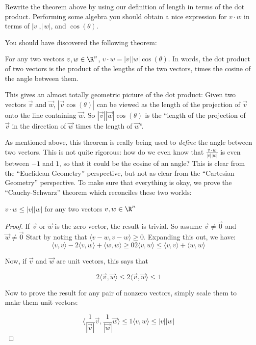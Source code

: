 \begin{question}
	Rewrite the theorem above by using our definition of length in terms of the dot product.  Performing some algebra you should obtain a nice expression for $v\cdot w$
	in terms of $|v|, |w|$, and $\cos(\theta)$.
 \end{question}
 
 You should have discovered the following theorem:
 
 \begin{theorem}
 	For any two vectors $v,w \in \R^n$,  $v \cdot w = |v||w|\cos(\theta)$.  In words, the dot product of two vectors is the product of the lengths of the two vectors,
 	times the cosine of the angle between them.
 \end{theorem}
 
 This gives an almost totally geometric picture of the dot product:  Given two vectors $\vec{v}$ and $\vec{w}$,  $|\vec{v}\cos(\theta)|$ can be viewed as the length of the
 projection of $\vec{v}$ onto the line containing $\vec{w}$.  So $|\vec{v}||\vec{w}|\cos(\theta)$ is the ``length of the projection of $\vec{v}$ in the direction of $\vec{w}$ times the
 length of $\vec{w}$''.
 
 As mentioned above, this theorem is really being used to \textit{define} the angle between two vectors.  This is not quite rigorous:  how do we even know that 
 $\frac{v \cdot w}{|v||w|}$ is even between $-1$ and $1$, so that it could be the cosine of an angle?  This is clear from the ``Euclidean Geometry'' perspective, 
 but not as clear from the ``Cartesian Geometry'' perspective.  To make sure that everything is okay, we prove the ``Cauchy-Schwarz'' theorem which reconciles these two
 worlds:
 
 \begin{theorem}
 	$v \cdot w \leq |v||w|$ for any two vectors $v,w \in \R^n$
 \end{theorem} 
 
 \begin{proof}
 	If $\vec{v}$ or $\vec{w}$ is the zero vector, the result is trivial.  So assume $\vec{v} \neq \vec{0}$ and $\vec{w} \neq \vec{0}$
	Start by noting that $\langle v-w,v-w\rangle \geq 0 $.  Expanding this out, we have:
	\[
		\langle v,v \rangle - 2 \langle v,w \rangle +\langle  w,w\rangle \geq 0
		2\langle v,w \rangle \leq \langle v,v \rangle  + \langle w,w\rangle
	\]
	
	Now, if $\vec{v}$ and $\vec{w}$ are unit vectors, this says that
	
	\[
	2\langle \vec{v}, \vec{w} \rangle \leq 2
	\langle \vec{v},\vec{w}\rangle \leq 1
	\]
	
	Now to prove the result for any pair of nonzero vectors, simply scale them to make them unit vectors:
	
	\[
	\langle \frac{1}{|\vec{v}|}\vec{v},\frac{1}{|\vec{w}|}\vec{w}\rangle \leq 1
	\langle v,w\rangle \leq  |v||w|
	\]
 \end{proof}
   
